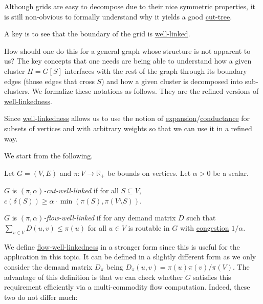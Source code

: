 Although grids are easy to decompose due to their nice symmetric properties, it is still non-obvious to formally understand why it yields a good \hyperref[def:cut-tree]{cut-tree}.

\begin{intuition}
	A key is to see that the boundary of the grid is \hyperref[def:well-linked]{well-linked}.
\end{intuition}

How should one do this for a general graph whose structure is not apparent to us? The key concepts that one needs are being able to understand how a given cluster \(H = G[S]\) interfaces with the rest of the graph through its boundary edges (those edges that cross \(S\)) and how a given cluster is decomposed into sub-clusters. We formalize these notations as follows. They are the refined versions of \hyperref[def:well-linked]{well-linkedness}.

\begin{intuition}
	Since \hyperref[def:well-linked]{well-linkedness} allows us to use the notion of \hyperref[def:expansion]{expansion}/\hyperref[def:conductance]{conductance} for subsets of vertices and with arbitrary weights so that we can use it in a refined way.
\end{intuition}

We start from the following.

\begin{definition}\label{def:cut-flow-well-linked}
	Let \(G = (V, E)\) and \(\pi \colon V \to \mathbb{R} _+\) be bounds on vertices. Let \(\alpha > 0\) be a scalar.
	\begin{definition}\label{def:cut-well-linked}
		\(G\) is \emph{\((\pi , \alpha) \)-cut-well-linked} if for all \(S \subseteq V\), \(c(\delta (S)) \geq \alpha \cdot \min (\pi (S), \pi (V \setminus S))\).
	\end{definition}

	\begin{definition}\label{def:flow-well-linked}
		\(G\) is \emph{\((\pi , \alpha )\)-flow-well-linked} if for any demand matrix \(D\) such that \(\sum_{v \in V} D(u, v) \leq \pi (u)\) for all \(u \in V\) is routable in \(G\) with \hyperref[def:congestion]{congestion} \(1 / \alpha \).
	\end{definition}
\end{definition}

We define \hyperref[def:flow-well-linked]{flow-well-linkedness} in a stronger form since this is useful for the application in this topic. It can be defined in a slightly different form as we only consider the demand matrix \(D_\pi \) being \(D_\pi (u, v) = \pi (u) \pi (v) / \pi (V)\). The advantage of this definition is that we can check whether \(G\) satisfies this requirement efficiently via a multi-commodity flow computation. Indeed, these two do not differ much:

